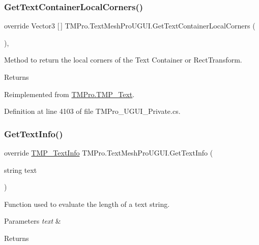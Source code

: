 \subsubsection{\texorpdfstring{GetTextContainerLocalCorners()}{GetTextContainerLocalCorners()}}
{\footnotesize\ttfamily override Vector3 \mbox{[}$\,$\mbox{]} T\+M\+Pro.\+Text\+Mesh\+Pro\+U\+G\+U\+I.\+Get\+Text\+Container\+Local\+Corners (\begin{DoxyParamCaption}{ }\end{DoxyParamCaption})\hspace{0.3cm}{\ttfamily [protected]}, {\ttfamily [virtual]}}



Method to return the local corners of the Text Container or Rect\+Transform. 

\begin{DoxyReturn}{Returns}

\end{DoxyReturn}


Reimplemented from \mbox{\hyperlink{class_t_m_pro_1_1_t_m_p___text_aad195b1745c7631eaed1376b554a64b9}{T\+M\+Pro.\+T\+M\+P\+\_\+\+Text}}.



Definition at line 4103 of file T\+M\+Pro\+\_\+\+U\+G\+U\+I\+\_\+\+Private.\+cs.

\mbox{\label{class_t_m_pro_1_1_text_mesh_pro_u_g_u_i_a8232388d078ad69a9ea241fa15bd2fab}} 
\subsubsection{\texorpdfstring{GetTextInfo()}{GetTextInfo()}}
{\footnotesize\ttfamily override \mbox{\hyperlink{class_t_m_pro_1_1_t_m_p___text_info}{T\+M\+P\+\_\+\+Text\+Info}} T\+M\+Pro.\+Text\+Mesh\+Pro\+U\+G\+U\+I.\+Get\+Text\+Info (\begin{DoxyParamCaption}\item[{string}]{text }\end{DoxyParamCaption})\hspace{0.3cm}{\ttfamily [virtual]}}



Function used to evaluate the length of a text string. 


\begin{DoxyParams}{Parameters}
{\em text} & \\
\hline
\end{DoxyParams}
\begin{DoxyReturn}{Returns}

\end{DoxyReturn}


